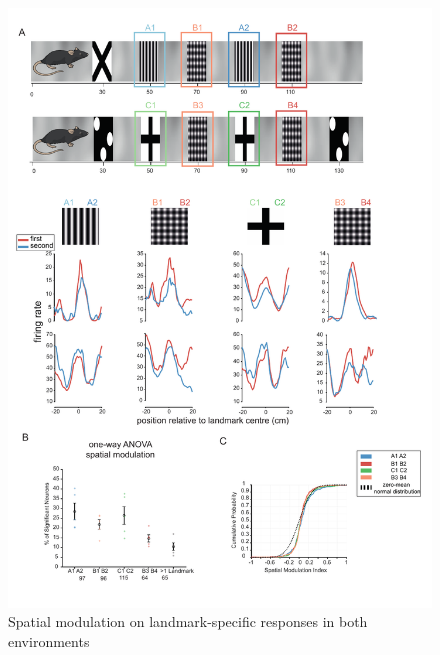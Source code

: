 \begin{figure}
    \centering
    \includegraphics[width=1\linewidth]{figures//Chapter 4 V1/fig3_spatial_modulation_intro.pdf}
    \caption{Spatial modulation on landmark-specific responses in both environments}
    \label{fig:placeholder}
\end{figure}



